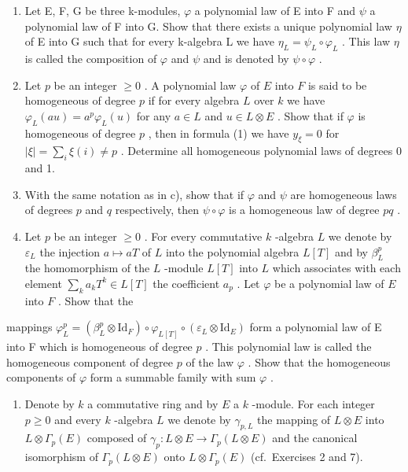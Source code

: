 \begin{enumerate}
\def\labelenumi{\alph{enumi})}
\setcounter{enumi}{2}
\item
  Let E, F, G be three k-modules, \(\varphi\) a polynomial law of E into F and \(\psi\) a polynomial law of F into G. Show that there exists a unique polynomial law \(\eta\) of E into G such that for every k-algebra L we have \(\eta_{L} = \psi_{L} \circ \varphi_{L}\) . This law \(\eta\) is called the composition of \(\varphi\) and \(\psi\) and is denoted by \(\psi \circ \varphi\) .
\item
  Let \(p\) be an integer \(\geqslant 0\) . A polynomial law \(\varphi\) of \(E\) into \(F\) is said to be homogeneous of degree \(p\) if for every algebra \(L\) over \(k\) we have \(\varphi_{L}(au) = a^{p}\varphi_{L}(u)\) for any \(a \in L\) and \(u \in L \otimes E\) . Show that if \(\varphi\) is homogeneous of degree \(p\) , then in formula (1) we have \(y_{\xi} = 0\) for \(|\xi| = \sum_{i} \xi(i) \neq p\) . Determine all homogeneous polynomial laws of degrees 0 and 1.
\item
  With the same notation as in c), show that if \(\varphi\) and \(\psi\) are homogeneous laws of degrees \(p\) and \(q\) respectively, then \(\psi \circ \varphi\) is a homogeneous law of degree \(pq\) .
\item
  Let \(p\) be an integer \(\geqslant 0\) . For every commutative \(k\) -algebra \(L\) we denote by \(\varepsilon_L\) the injection \(a \mapsto aT\) of \(L\) into the polynomial algebra \(L[T]\) and by \(\beta_L^p\) the homomorphism of the \(L\) -module \(L[T]\) into \(L\) which associates with each element \(\sum_k a_k T^k \in L[T]\) the coefficient \(a_p\) . Let \(\varphi\) be a polynomial law of \(E\) into \(F\) . Show that the
\end{enumerate}

mappings \(\varphi_{L}^{p} = (\beta_{L}^{p}\otimes \mathrm{Id}_{F})\circ \varphi_{L[T]}\circ (\varepsilon_{L}\otimes \mathrm{Id}_{E})\) form a polynomial law of E into F which is homogeneous of degree \(p\) . This polynomial law is called the homogeneous component of degree \(p\) of the law \(\varphi\) . Show that the homogeneous components of \(\varphi\) form a summable family with sum \(\varphi\) .

\begin{enumerate}
\def\labelenumi{\arabic{enumi})}
\setcounter{enumi}{9}
\tightlist
\item
  Denote by \(k\) a commutative ring and by \(E\) a \(k\) -module. For each integer \(p \geqslant 0\) and every \(k\) -algebra \(L\) we denote by \(\gamma_{p,L}\) the mapping of \(L \otimes E\) into \(L \otimes \Gamma_p(E)\) composed of \(\gamma_p: L \otimes E \to \Gamma_p(L \otimes E)\) and the canonical isomorphism of \(\Gamma_p(L \otimes E)\) onto \(L \otimes \Gamma_p(E)\) (cf.~Exercises 2 and 7).
\end{enumerate}

